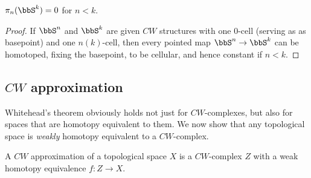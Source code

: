 \begin{cor}\label{cor pi_n(S^k)=0}
    $\pi_n(\bbS^k)=0$ for $n<k$.
\end{cor}
\begin{proof}
    If $\bbS^n$ and $\bbS^k$ are given $CW$ structures with one $0$-cell (serving as as basepoint) and one $n(k)$-cell, then every pointed map $\bbS^n\to \bbS^k$ can be homotoped, fixing the basepoint, to be cellular, and hence constant if $n<k$.
\end{proof}





\subsection{\texorpdfstring{$CW$}{CW} approximation}\label{sec: CW approx}

Whitehead's theorem obviously holds not just for $CW$-complexes, but also for spaces that are homotopy equivalent to them. We now show that any topological space is \emph{weakly} homotopy equivalent to a $CW$-complex.

\begin{defn}[$CW$ approximation]
    A $CW$ approximation of a topological space $X$ is a $CW$-complex $Z$ with a weak homotopy equivalence $f:Z\to X$.
\end{defn}

